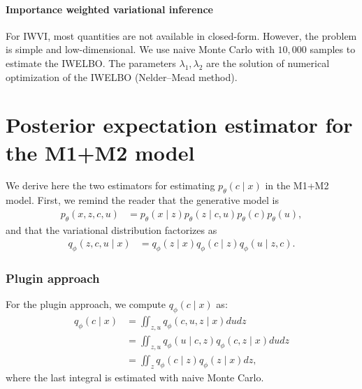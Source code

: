 \paragraph{Importance weighted variational inference} For IWVI, most quantities are not available in closed-form. However, the problem is simple and low-dimensional. We use naive Monte Carlo with $10,000$ samples to estimate the IWELBO. The parameters $\lambda_1, \lambda_2$ are the solution of numerical optimization of the IWELBO (Nelder–Mead method). 


\section{Posterior expectation estimator for the M1+M2 model}
\label{app:m1m2esti}

We derive here the two estimators for estimating $p_\theta(c \mid x)$ in the M1+M2 model. First, we remind the reader that the generative model is
\begin{align}
\label{eq:m1m2_gen_app}
    p_\theta(x, z, c, u) &= p_\theta(x \mid z)p_\theta(z \mid c, u)p_\theta(c)p_\theta(u),
\end{align}
and that the variational distribution factorizes as
\begin{align}
q_\phi(z, c, u \mid x) &= q_\phi(z \mid x)q_\phi(c \mid z)q_\phi(u \mid z, c).
\end{align}

\subsubsection{Plugin approach}
For the plugin approach, we compute $q_\phi(c \mid x)$ as:
\begin{align}
    q_\phi(c \mid x) &= \iint_{z, u} q_\phi(c, u, z \mid x)dudz \\ 
    &= \iint_{z, u} q_\phi(u \mid c, z)q_\phi(c, z \mid x)dudz \\
    &= \iint_{z} q_\phi(c \mid z) q_\phi(z \mid x)dz,
\end{align}
where the last integral is estimated with naive Monte Carlo. 

